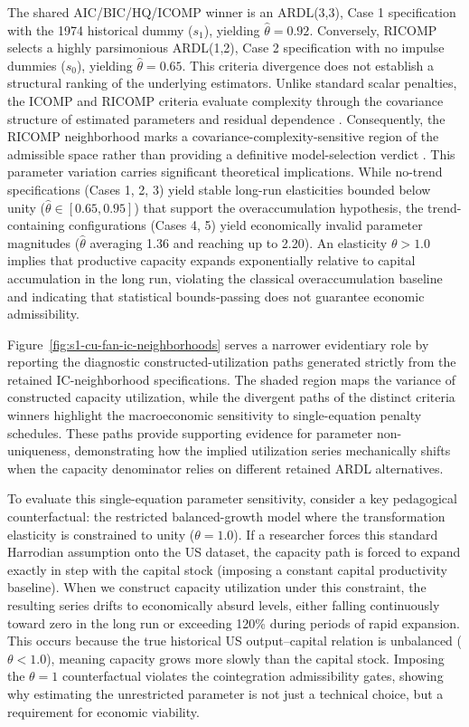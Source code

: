 \documentclass[11pt]{article}
\begin{document}
The shared AIC/BIC/HQ/ICOMP winner is an ARDL(3,3), Case 1 specification with the 1974 historical dummy (\(s_1\)), yielding \(\hat{\theta}=0.92\). Conversely, RICOMP selects a highly parsimonious ARDL(1,2), Case 2 specification with no impulse dummies (\(s_0\)), yielding \(\hat{\theta}=0.65\). This criteria divergence does not establish a structural ranking of the underlying estimators. Unlike standard scalar penalties, the ICOMP and RICOMP criteria evaluate complexity through the covariance structure of estimated parameters and residual dependence \citep{Bozdogan1990,Bozdogan2000}. Consequently, the RICOMP neighborhood marks a covariance-complexity-sensitive region of the admissible space rather than providing a definitive model-selection verdict \citep{GuneyBozdoganArslan2021}. This parameter variation carries significant theoretical implications. While no-trend specifications (Cases 1, 2, 3) yield stable long-run elasticities bounded below unity ($\hat{\theta} \in [0.65, 0.95]$) that support the overaccumulation hypothesis, the trend-containing configurations (Cases 4, 5) yield economically invalid parameter magnitudes ($\hat{\theta}$ averaging 1.36 and reaching up to 2.20). An elasticity $\theta > 1.0$ implies that productive capacity expands exponentially relative to capital accumulation in the long run, violating the classical overaccumulation baseline and indicating that statistical bounds-passing does not guarantee economic admissibility.

Figure~\ref{fig:s1-cu-fan-ic-neighborhoods} serves a narrower evidentiary role by reporting the diagnostic constructed-utilization paths generated strictly from the retained IC-neighborhood specifications. The shaded region maps the variance of constructed capacity utilization, while the divergent paths of the distinct criteria winners highlight the macroeconomic sensitivity to single-equation penalty schedules. These paths provide supporting evidence for parameter non-uniqueness, demonstrating how the implied utilization series mechanically shifts when the capacity denominator relies on different retained ARDL alternatives.

To evaluate this single-equation parameter sensitivity, consider a key pedagogical counterfactual: the restricted balanced-growth model where the transformation elasticity is constrained to unity ($\theta = 1.0$). If a researcher forces this standard Harrodian assumption onto the US dataset, the capacity path is forced to expand exactly in step with the capital stock (imposing a constant capital productivity baseline). When we construct capacity utilization under this constraint, the resulting series drifts to economically absurd levels, either falling continuously toward zero in the long run or exceeding 120\% during periods of rapid expansion. This occurs because the true historical US output--capital relation is unbalanced ($\theta < 1.0$), meaning capacity grows more slowly than the capital stock. Imposing the $\theta=1$ counterfactual violates the cointegration admissibility gates, showing why estimating the unrestricted parameter is not just a technical choice, but a requirement for economic viability.
\end{document}
